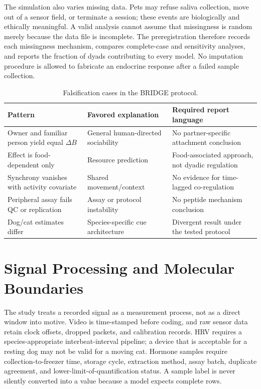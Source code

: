 \documentclass[conference]{IEEEtran}
\begin{document}
The simulation also varies missing data. Pets may refuse saliva collection, move out of a sensor field, or terminate a session; these events are biologically and ethically meaningful. A valid analysis cannot assume that missingness is random merely because the data file is incomplete. The preregistration therefore records each missingness mechanism, compares complete-case and sensitivity analyses, and reports the fraction of dyads contributing to every model. No imputation procedure is allowed to fabricate an endocrine response after a failed sample collection.

\begin{table}[t]
\caption{Falsification cases in the BRIDGE protocol.}
\label{tab:falsification}
\centering
\footnotesize
\begin{tabular}{p{}p{}p{}}
\toprule
\textbf{Pattern} & \textbf{Favored explanation} & \textbf{Required report language} \\
\midrule
Owner and familiar person yield equal $\Delta B$ & General human-directed sociability & No partner-specific attachment conclusion \\
Effect is food-dependent only & Resource prediction & Food-associated approach, not dyadic regulation \\
Synchrony vanishes with activity covariate & Shared movement/context & No evidence for time-lagged co-regulation \\
Peripheral assay fails QC or replication & Assay or protocol instability & No peptide mechanism conclusion \\
Dog/cat estimates differ & Species-specific cue architecture & Divergent result under the tested protocol \\
\bottomrule
\end{tabular}
\end{table}

\section{Signal Processing and Molecular Boundaries}

The study treats a recorded signal as a measurement process, not as a direct window into motive. Video is time-stamped before coding, and raw sensor data retain clock offsets, dropped packets, and calibration records. HRV requires a species-appropriate interbeat-interval pipeline; a device that is acceptable for a resting dog may not be valid for a moving cat. Hormone samples require collection-to-freezer time, storage cycle, extraction method, assay batch, duplicate agreement, and lower-limit-of-quantification status. A sample label is never silently converted into a value because a model expects complete rows.
\end{document}
